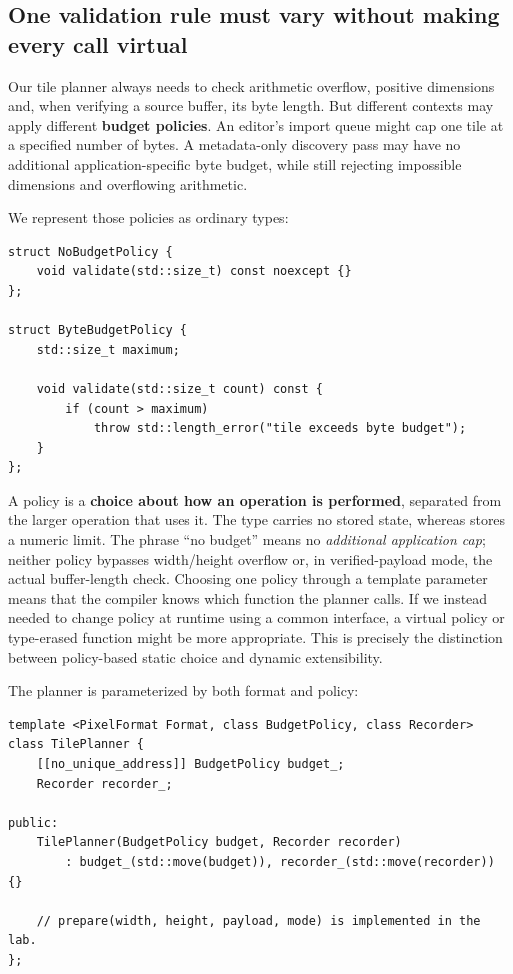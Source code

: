 \subsection{One validation rule must vary without making every call virtual}\label{01-foundations-i-ch005-one-validation-rule-must-vary-without-making-every-call-virtual}

\hypertarget{01-foundations-i-ch005-one-validation-rule-must-vary-without-making-every-call-virtual}{}

Our tile planner always needs to check arithmetic overflow, positive dimensions and, when verifying a source buffer, its byte length. But different contexts may apply different \textbf{budget policies}. An editor's import queue might cap one tile at a specified number of bytes. A metadata-only discovery pass may have no additional application-specific byte budget, while still rejecting impossible dimensions and overflowing arithmetic.

We represent those policies as ordinary types:

\begin{verbatim}
struct NoBudgetPolicy {
    void validate(std::size_t) const noexcept {}
};

struct ByteBudgetPolicy {
    std::size_t maximum;

    void validate(std::size_t count) const {
        if (count > maximum)
            throw std::length_error("tile exceeds byte budget");
    }
};
\end{verbatim}

A policy is a \textbf{choice about how an operation is performed}, separated from the larger operation that uses it. The type  carries no stored state, whereas  stores a numeric limit. The phrase ``no budget'' means no \emph{additional application cap}; neither policy bypasses width/height overflow or, in verified-payload mode, the actual buffer-length check. Choosing one policy through a template parameter means that the compiler knows which  function the planner calls. If we instead needed to change policy at runtime using a common interface, a virtual policy or type-erased function might be more appropriate. This is precisely the distinction between policy-based static choice and dynamic extensibility.

The planner is parameterized by both format and policy:

\begin{verbatim}
template <PixelFormat Format, class BudgetPolicy, class Recorder>
class TilePlanner {
    [[no_unique_address]] BudgetPolicy budget_;
    Recorder recorder_;

public:
    TilePlanner(BudgetPolicy budget, Recorder recorder)
        : budget_(std::move(budget)), recorder_(std::move(recorder)) {}

    // prepare(width, height, payload, mode) is implemented in the lab.
};
\end{verbatim}

